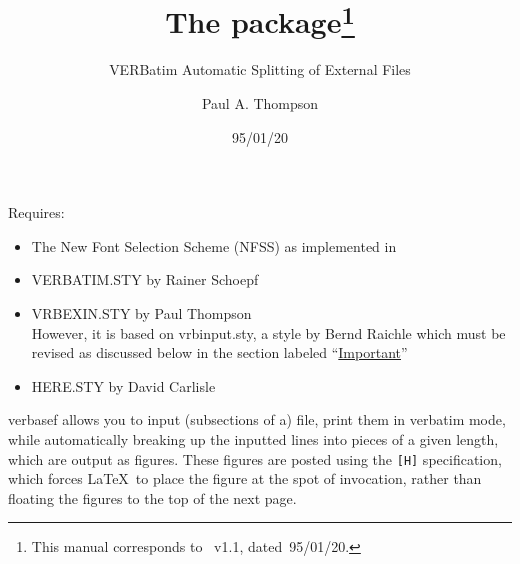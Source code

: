 \documentclass[pagesize=auto]{scrartcl}
\title{The \pkg{verbasef} package\thanks{This manual corresponds to \pkg{verbasef.sty}~v1.1, dated~95/01/20.}}
\subtitle{VERBatim Automatic Splitting of External Files}
\author{Paul A. Thompson}
\date{95/01/20}
\newcommand*{\pkg}[1]{\textsf{#1}}
\begin{document}
\maketitle

\noindent
Requires:
%
\begin{itemize}
\item The New Font Selection Scheme (NFSS) as implemented in \LaTeXe
\item \pkg{VERBATIM.STY} by Rainer Schoepf
\item \pkg{VRBEXIN.STY} by Paul Thompson \\
  However, it is based on \pkg{vrbinput.sty}, a style by 
  Bernd Raichle which must be revised as discussed below
  in the section labeled ``\hyperref[sec:important]{Important}''
\item \pkg{HERE.STY} by David Carlisle
\end{itemize}

\pkg{verbasef} allows you to input (subsections of a) file, print them in
verbatim mode, while automatically breaking up the inputted lines into
pieces of a given length, which are output as figures.  These figures are
posted using the \verb+[H]+ specification, which forces \LaTeX\ to place the figure
at the spot of invocation, rather than floating the figures to the top of
the next page.
\end{document}

